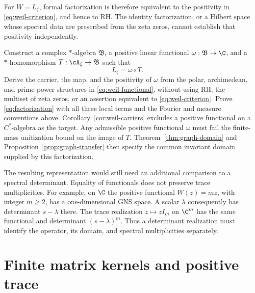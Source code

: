 For $W=L_\zeta$, formal factorization is therefore equivalent to the
positivity in \eqref{eq:weil-criterion}, and hence to RH.  The identity
factorization, or a Hilbert space whose spectral data are prescribed from
the zeta zeros, cannot establish that positivity independently.

\begin{openproblem}
Construct a complex $*$-algebra $\mathfrak B$, a positive linear
functional $\omega:\mathfrak B\to\C$, and a $*$-homomorphism
$T:\cA_\zeta\to\mathfrak B$ such that
\begin{equation}
 L_\zeta=\omega\circ T.
 \label{eq:factorization}
\end{equation}
Derive the carrier, the map, and the positivity of $\omega$ from the
polar, archimedean, and prime-power structures in
\eqref{eq:weil-functional}, without using RH, the multiset of zeta zeros,
or an assertion equivalent to \eqref{eq:weil-criterion}.  Prove
\eqref{eq:factorization} with all three local terms and the Fourier and
measure conventions above.  Corollary~\ref{cor:weil-carriers} excludes
a positive functional on a $C^*$-algebra as the target.
Any admissible positive functional $\omega$ must fail the finite-mass
unitization bound on the image of $T$.
Theorem~\ref{thm:graph-domain} and
Proposition~\ref{prop:graph-transfer} then specify the common invariant
domain supplied by this factorization.
\end{openproblem}

The resulting representation would still need an additional comparison
to a spectral determinant.  Equality of functionals does not preserve
trace multiplicities.  For example, on $\C$ the positive functional
$W(z)=mz$, with integer $m\geq2$, has a one-dimensional GNS space.
A scalar $\lambda$ consequently has determinant $s-\lambda$ there.
The trace realization $z\mapsto zI_m$ on $\C^m$ has the same functional
and determinant $(s-\lambda)^m$.  Thus a determinant realization must
identify the operator, its domain, and spectral multiplicities separately.


\section{Finite matrix kernels and positive trace}
\label{sec:weil-formal-kernels}

